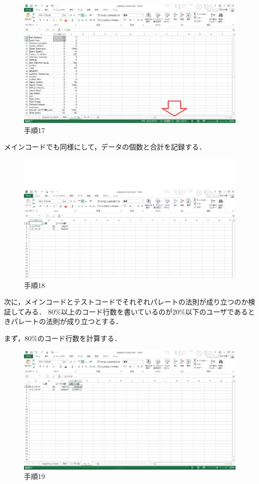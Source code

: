 \begin{figure}[h]
\centering
\includegraphics[width=13cm]{process17.png}
\caption{手順17}
\end{figure}

\newpage

メインコードでも同様にして，データの個数と合計を記録する．

\begin{figure}[h]
\centering
\includegraphics[width=13cm]{process18.png}
\caption{手順18}
\end{figure}

次に，メインコードとテストコードでそれぞれパレートの法則が成り立つのか検証してみる．
80\%以上のコード行数を書いているのが20\%以下のユーザであるときパレートの法則が成り立つとする．

まず，80\%のコード行数を計算する．

\begin{figure}[h]
\centering
\includegraphics[width=13cm]{process19.png}
\caption{手順19}
\end{figure}

